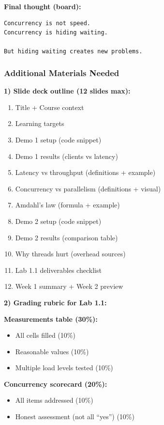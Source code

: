 \documentclass[11pt,a4paper]{article}
\begin{document}
\textbf{Final thought (board):}
\begin{verbatim}
Concurrency is not speed.
Concurrency is hiding waiting.

But hiding waiting creates new problems.
\end{verbatim}

\subsubsection*{Additional Materials Needed}

\textbf{1) Slide deck outline (12 slides max):}
\begin{enumerate}[leftmargin=*]
\item Title + Course context
\item Learning targets
\item Demo 1 setup (code snippet)
\item Demo 1 results (clients vs latency)
\item Latency vs throughput (definitions + example)
\item Concurrency vs parallelism (definitions + visual)
\item Amdahl's law (formula + example)
\item Demo 2 setup (code snippet)
\item Demo 2 results (comparison table)
\item Why threads hurt (overhead sources)
\item Lab 1.1 deliverables checklist
\item Week 1 summary + Week 2 preview
\end{enumerate}

\vspace{1mm}
\textbf{2) Grading rubric for Lab 1.1:}

\textbf{Measurements table (30\%):}
\begin{itemize}[leftmargin=*]
\item[$\square$] All cells filled (10\%)
\item[$\square$] Reasonable values (10\%)
\item[$\square$] Multiple load levels tested (10\%)
\end{itemize}

\textbf{Concurrency scorecard (20\%):}
\begin{itemize}[leftmargin=*]
\item[$\square$] All items addressed (10\%)
\item[$\square$] Honest assessment (not all ``yes'') (10\%)
\end{itemize}
\end{document}
